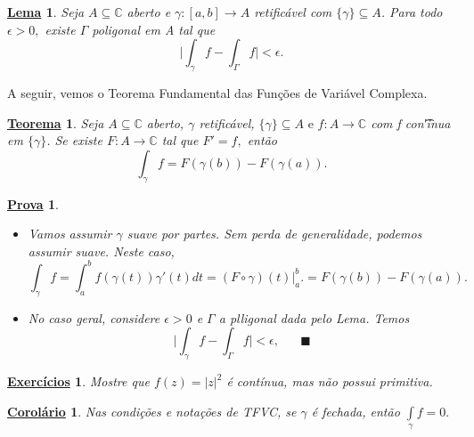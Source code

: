 \documentclass{article}
\newtheorem*{theorem*}{\underline{Teorema}}
\newtheorem*{proof*}{\underline{Prova}}
\newtheorem*{crl*}{\underline{Corol\'ario}}
\newtheorem*{lmm*}{\underline{Lema}}
\newtheorem*{exer*}{\underline{Exerc\'icios}}
\renewcommand\qedsymbol{$\blacksquare$}
\begin{document}
  \begin{lmm*}
    Seja $A\subseteq{\mathbb{C}}$ aberto e $\gamma:[a, b]\rightarrow A$ retific\'avel com $\{\gamma\}\subseteq{A}$. Para todo $\epsilon > 0,$
    existe $\Gamma$ poligonal em A tal que 
    $$
    \biggl|\int_{\gamma}^{}f - \int_{\Gamma}^{}f\biggr| < \epsilon.
    $$
  \end{lmm*}
  A seguir, vemos o Teorema Fundamental das Fun\c c\~oes de Vari\'avel Complexa.
  \begin{theorem*}
    Seja $A\subseteq{\mathbb{C}}$ aberto, $\gamma$ retific\'avel, $\{\gamma\}\subseteq{A}\text{ e }f:A\rightarrow \mathbb{C} $ com f 
    con\t'inua em $\{\gamma\} $. Se existe $F:A\rightarrow \mathbb{C}$ tal que $F' = f,$ ent\~ao
    $$
    \int_{\gamma}^{}f = F(\gamma(b)) - F(\gamma(a)).
    $$
  \end{theorem*}
  \begin{proof*}
    \begin{itemize}
      \item[i)] Vamos assumir $\gamma$ suave por partes. Sem perda de generalidade, podemos assumir suave. Neste caso,
        $$
        \int_{\gamma}^{}f = \int_{a}^{b} f(\gamma(t))\gamma'(t)dt = (F\circ{\gamma})(t)\biggl|_a^b\biggr. = F(\gamma(b)) - F(\gamma(a)).
        $$
      \item[ii)] No caso geral, considere $\epsilon > 0$ e $\Gamma$ a plligonal dada pelo Lema. Temos
        $$
        \biggl|\int_{\gamma}^{}f - \int_{\Gamma}^{}f\biggr| < \epsilon, \quad\text{ \qedsymbol}
        $$
    \end{itemize}
  \end{proof*}
  \begin{exer*}
    Mostre que $f(z) = |z|^2$ \'e cont\'inua, mas n\~ao possui primitiva.
  \end{exer*}
  \begin{crl*}
    Nas condi\c c\~oes e nota\c c\~oes de TFVC, se $\gamma$ \'e fechada, ent\~ao $\int\limits_{\gamma}f = 0.$
  \end{crl*}
\end{document}
